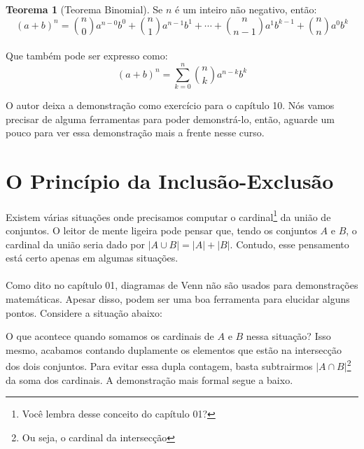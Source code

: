 \documentclass[a4paper,11pt,oneside]{book}
\theoremstyle{definition}
\theoremstyle{break}
\newtheorem{theorem}{Teorema}
\begin{document}
\begin{theorem}[Teorema Binomial]
Se $n$ é um inteiro não negativo, então:
$$(a+b)^n = {n \choose 0}a^{n-0}b^{0} + {n \choose 1}a^{n-1}b^1 + \cdots + {n \choose n-1}a^1b^{k-1} + {n \choose n}a^{0}b^k $$
\\
Que também pode ser expresso como:
$$(a+b)^n = \sum\limits_{k=0}^n {n \choose k}a^{n-k}b^k$$
\end{theorem}

O autor deixa a demonstração como exercício para o capítulo 10. Nós vamos precisar de alguma ferramentas para poder demonstrá-lo, então, aguarde um pouco para ver essa demonstração mais a frente nesse curso.

\section{O Princípio da Inclusão-Exclusão}

Existem várias situações onde precisamos computar o cardinal\footnote{Você lembra desse conceito do capítulo 01?} da união de conjuntos. O leitor de mente ligeira pode pensar que, tendo os conjuntos $A$ e $B$, o cardinal da união seria dado por $|A \cup B| = |A| + |B|$. Contudo, esse pensamento está certo apenas em algumas situações.
\\
\\
Como dito no capítulo 01, diagramas de Venn não são usados para demonstrações matemáticas. Apesar disso, podem ser uma boa ferramenta para elucidar alguns pontos. Considere a situação abaixo:

\begin{center}
\end{center}

O que acontece quando somamos os cardinais de $A$ e $B$ nessa situação? Isso mesmo, acabamos contando duplamente os elementos que estão na intersecção dos dois conjuntos. Para evitar essa dupla contagem, basta subtrairmos $|A \cap B|$\footnote{Ou seja, o cardinal da intersecção} da soma dos cardinais. A demonstração mais formal segue a baixo.
\end{document}

